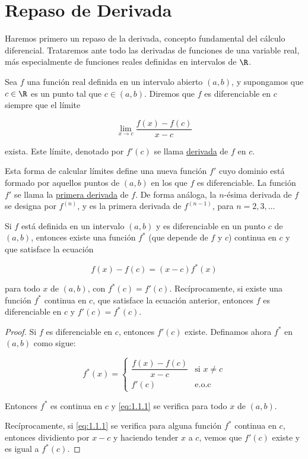 \section{Repaso de Derivada}

Haremos primero un repaso de la derivada, concepto fundamental del cálculo diferencial. Trataremos ante todo las derivadas de funciones de una variable real, más especialmente de funciones reales definidas en intervalos de $\R$.

\begin{defn}
    Sea $f$ una función real definida en un intervalo abierto $(a, b)$, y supongamos que $c \in \R$ es un punto tal que $c \in (a, b)$. Diremos que $f$ es diferenciable en $c$ siempre que el límite
    
    \[
    \lim_{x \to c} \frac{f(x) - f(c)}{x-c}
    \]
    
    \noindent exista. Este límite, denotado por $f'(c)$ se llama \ul{derivada} de $f$ en $c$.
\end{defn}

Esta forma de calcular límites define una nueva función $f'$ cuyo dominio está formado por aquellos puntos de $(a, b)$ en los que $f$ es diferenciable. La función $f'$ se llama la \ul{primera derivada} de $f$. De forma análoga, la $n$-ésima derivada de $f$ se designa por $f^{(n)}$, y es la primera derivada de $f^{(n-1)}$, para $n = 2, 3, \dots$

\begin{teo}\label{teo:1.1.1}
    Si $f$ está definida en un intervalo $(a, b)$ y es diferenciable en un punto $c$ de $(a, b)$, entonces existe una función $f^*$ (que depende de $f$ y $c$) continua en $c$ y que satisface la ecuación
    
    \begin{equation}\label{eq:1.1.1}
        f(x) - f(c) = (x-c)f^*(x)
    \end{equation}
    
    \noindent para todo $x$ de $(a, b)$, con $f^*(c) = f'(c)$. Recíprocamente, si existe una función $f^*$ continua en $c$, que satisface la ecuación anterior, entonces $f$ es diferenciable en $c$ y $f'(c) = f^*(c)$.
\end{teo}

\begin{proof}
    Si $f$ es diferenciable en $c$, entonces $f'(c)$ existe. Definamos ahora $f^*$  en $(a, b)$ como sigue:
    
    \[
    f^*(x) = 
    \begin{cases}
        \dfrac{f(x) - f(c)}{x-c} & \text{si $x \neq c$} \\
        f'(c) & \text{e.o.c}
    \end{cases}
    \]
    
    Entonces $f^*$ es continua en $c$ y \ref{eq:1.1.1} se verifica para todo $x$ de $(a, b)$.
    
    Recíprocamente, si \ref{eq:1.1.1} se verifica para alguna función $f^*$ continua en $c$, entonces dividiento por $x-c$ y haciendo tender $x$ a $c$, vemos que $f'(c)$ existe y es igual a $f^*(c)$.
\end{proof}

